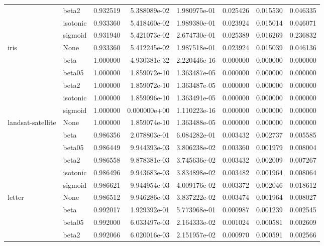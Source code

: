 \begin{tabular}{llrrrrrr}
        & beta2 &  0.932519 &  5.388089e-02 &  1.980975e-01 &  0.025426 &  0.015530 &  0.046335 \\
        & isotonic &  0.933360 &  5.418460e-02 &  1.989380e-01 &  0.023924 &  0.015014 &  0.046071 \\
        & sigmoid &  0.931940 &  5.421073e-02 &  2.674730e-01 &  0.025389 &  0.016269 &  0.236832 \\
iris & None &  0.933360 &  5.412245e-02 &  1.987518e-01 &  0.023924 &  0.015039 &  0.046136 \\
        & beta &  1.000000 &  4.930381e-32 &  2.220446e-16 &  0.000000 &  0.000000 &  0.000000 \\
        & beta05 &  1.000000 &  1.859072e-10 &  1.363487e-05 &  0.000000 &  0.000000 &  0.000000 \\
        & beta2 &  1.000000 &  1.859072e-10 &  1.363487e-05 &  0.000000 &  0.000000 &  0.000000 \\
        & isotonic &  1.000000 &  1.859096e-10 &  1.363491e-05 &  0.000000 &  0.000000 &  0.000000 \\
        & sigmoid &  1.000000 &  0.000000e+00 &  1.110223e-16 &  0.000000 &  0.000000 &  0.000000 \\
landsat-satellite & None &  1.000000 &  1.859074e-10 &  1.363488e-05 &  0.000000 &  0.000000 &  0.000000 \\
        & beta &  0.986356 &  2.078803e-01 &  6.084282e-01 &  0.003432 &  0.002737 &  0.005585 \\
        & beta05 &  0.986449 &  9.944393e-03 &  3.806238e-02 &  0.003360 &  0.001979 &  0.008004 \\
        & beta2 &  0.986558 &  9.878381e-03 &  3.745636e-02 &  0.003432 &  0.002009 &  0.007267 \\
        & isotonic &  0.986496 &  9.943683e-03 &  3.834898e-02 &  0.003482 &  0.001964 &  0.008064 \\
        & sigmoid &  0.986621 &  9.944954e-03 &  4.009176e-02 &  0.003372 &  0.002046 &  0.018612 \\
letter & None &  0.986512 &  9.946286e-03 &  3.837222e-02 &  0.003474 &  0.001964 &  0.008027 \\
        & beta &  0.992017 &  1.929392e-01 &  5.773968e-01 &  0.000987 &  0.001239 &  0.002545 \\
        & beta05 &  0.992000 &  6.033497e-03 &  2.164333e-02 &  0.001024 &  0.000581 &  0.002609 \\
        & beta2 &  0.992066 &  6.020016e-03 &  2.151957e-02 &  0.000970 &  0.000591 &  0.002566 \\

\end{tabular}
